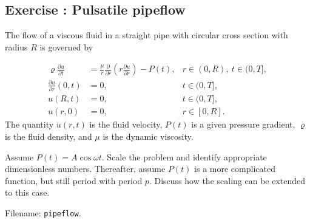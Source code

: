 \documentclass[graybox,envcountchap,sectrefs,final]{svmonodo}
\newcounter{doconce:movie:counter}
\newenvironment{doconceexercise}{}{}
\newcounter{doconceexercisecounter}
\begin{document}
\begin{doconceexercise}

\subsection*{Exercise \thedoconceexercisecounter: Pulsatile pipeflow}

\label{scale:exer:pipeflow:pulsatile}

The flow of a viscous fluid in a straight pipe with circular
cross section with radius $R$ is governed by

\begin{align}
\varrho\frac{\partial u}{\partial t} &= \frac{\mu}{r}\frac{\partial}{\partial r}
\left(r\frac{\partial u}{\partial r}\right) - P(t), & r\in (0,R),\ t\in (0,T],\\ 
\frac{\partial u}{\partial r}(0,t) &= 0, & t\in (0,T],\\ 
u(R,t) &= 0, & t\in (0,T],\\ 
u(r,0) &= 0, & r\in [0,R].
\end{align}
The quantity $u(r,t)$ is the fluid velocity, $P(t)$ is a given
pressure gradient, $\varrho$ is the fluid density, and $\mu$ is the
dynamic viscosity.

Assume $P(t) = A\cos\omega t$. Scale the problem and identify
appropriate dimensionless numbers. Thereafter, assume $P(t)$ is a more
complicated function, but still period with period $p$.
Discuss how the scaling can be extended to this case.


\noindent Filename: \texttt{pipeflow}.

\end{doconceexercise}
\end{document}
